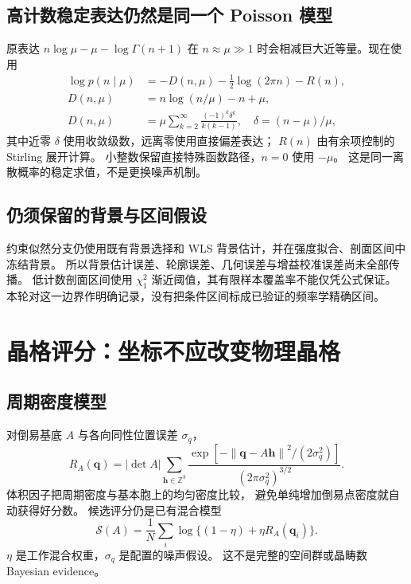 \documentclass[UTF8,11pt,a4paper,fontset=fandol]{ctexart}
\newcommand{\Z}{\mathbb Z}
\newcommand{\norm}[1]{\left\lVert#1\right\rVert}
\begin{document}
\subsection{高计数稳定表达仍然是同一个 Poisson 模型}

原表达
$n\log\mu-\mu-\log\Gamma(n+1)$
在 $n\approx\mu\gg1$ 时会相减巨大近等量。现在使用
\begin{align}
\log p(n\mid\mu)
&=-D(n,\mu)-\tfrac12\log(2\pi n)-R(n),\\
D(n,\mu)&=n\log(n/\mu)-n+\mu,\\
D(n,\mu)&=\mu\sum_{k=2}^{\infty}
\frac{(-1)^k\delta^k}{k(k-1)},\quad \delta=(n-\mu)/\mu,
\end{align}
其中近零 $\delta$ 使用收敛级数，远离零使用直接偏差表达；
$R(n)$ 由有余项控制的 Stirling 展开计算\cite{dlmf}。
小整数保留直接特殊函数路径，$n=0$ 使用 $-\mu$。
这是同一离散概率的稳定求值，不是更换噪声机制。

\subsection{仍须保留的背景与区间假设}

约束似然分支仍使用既有背景选择和 WLS 背景估计，并在强度拟合、剖面区间中冻结背景。
所以背景估计误差、轮廓误差、几何误差与增益校准误差尚未全部传播。
低计数剖面区间使用 $\chi_1^2$ 渐近阈值，其有限样本覆盖率不能仅凭公式保证。
本轮对这一边界作明确记录，没有把条件区间标成已验证的频率学精确区间。

\section{晶格评分：坐标不应改变物理晶格}

\subsection{周期密度模型}

对倒易基底 $A$ 与各向同性位置误差 $\sigma_q$，
\begin{equation}
R_A(\bm q)=|\det A|
\sum_{\bm h\in\Z^3}
\frac{\exp[-\norm{\bm q-A\bm h}^2/(2\sigma_q^2)]}
{(2\pi\sigma_q^2)^{3/2}}.
\end{equation}
体积因子把周期密度与基本胞上的均匀密度比较，
避免单纯增加倒易点密度就自动获得好分数。
候选评分仍是已有混合模型
\begin{equation}
\mathcal S(A)=\frac1N\sum_i
\log\{(1-\eta)+\eta R_A(\bm q_i)\}.
\end{equation}
$\eta$ 是工作混合权重，$\sigma_q$ 是配置的噪声假设。
这不是完整的空间群或晶畴数 Bayesian evidence。
\end{document}

